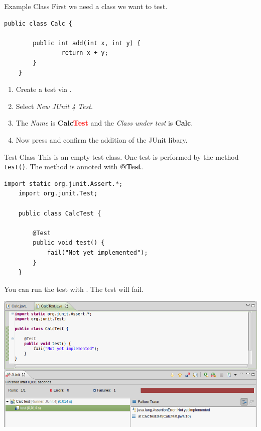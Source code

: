 \begin{frame}[fragile]{Example Class}
	First we need a class we want to test.
	\begin{lstlisting}[basicstyle=\ttfamily\scriptsize]
	public class Calc {

	    public int add(int x, int y) {
	        	return x + y;
	    }
	}
	\end{lstlisting}
	\begin{enumerate}
		\item Create a test via .
		\item Select \emph{New JUnit 4 Test}.
		\item The \emph{Name} is \textbf{Calc\textcolor{red}{Test}} and 
				the \emph{Class under test} is \textbf{Calc}.
		\item Now press  and confirm the addition of the JUnit libary.
	\end{enumerate}
\end{frame}

\begin{frame}[fragile]{Test Class}
	This is an empty test class. One test is performed by the method \texttt{test()}. 
	The method is annoted with \textbf{@Test}.
	\begin{lstlisting}[basicstyle=\ttfamily\scriptsize, escapechar=!]
	import static org.junit.Assert.*;
	import org.junit.Test;

	public class CalcTest {

	    @Test
	    public void test() {
	        fail("Not yet implemented");
	    }
	}
	\end{lstlisting}
	You can run the test with . The test will fail.
\end{frame}

\begin{frame}{}
	\includegraphics[scale=.3]{res/testing_fail.png}
\end{frame}

